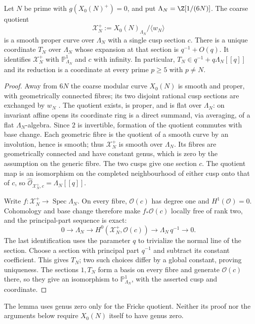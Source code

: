\begin{lemma}\label{lem:coordinate}
Let $N$ be prime with $g(X_0(N)^+)=0$, and put
$\Lambda_N=\Z[1/(6N)]$. The coarse quotient
\[
\mathcal X_N^+:=X_0(N)_{\Lambda_N}/\langle w_N\rangle
\]
is a smooth proper curve over $\Lambda_N$ with a single cusp section $c$.
There is a unique coordinate $T_N$ over $\Lambda_N$ whose expansion at
that section is $q^{-1}+O(q)$. It identifies $\mathcal X_N^+$ with
$\mathbb P^1_{\Lambda_N}$ and $c$ with infinity. In particular,
$T_N\in q^{-1}+q\Lambda_N[[q]]$ and its reduction is a coordinate
at every prime $p\ge5$ with $p\ne N$.
\end{lemma}
\begin{proof}
Away from $6N$ the coarse modular curve $X_0(N)$ is smooth and proper,
with geometrically connected fibres; its two disjoint rational cusp
sections are exchanged by $w_N$ \citep{DR73,KM85}.
The quotient exists, is proper, and is flat over $\Lambda_N$:
on invariant affine opens its coordinate ring is a direct summand,
via averaging, of a flat $\Lambda_N$-algebra. Since $2$ is invertible,
formation of the quotient commutes with base change. Each geometric
fibre is the quotient of a smooth curve by an involution, hence is
smooth; thus $\mathcal X_N^+$ is smooth over $\Lambda_N$.
Its fibres are geometrically connected and have constant genus,
which is zero by the assumption on the generic fibre.
The two cusps give one section $c$. The quotient map is an isomorphism
on the completed neighbourhood of either cusp onto that of $c$, so
$\widehat{\mathcal O}_{\mathcal X_N^+,c}=\Lambda_N[[q]]$.

Write $f:\mathcal X_N^+\to\operatorname{Spec}\Lambda_N$.
On every fibre, $\mathcal O(c)$ has degree one and $H^1(\mathcal O)=0$.
Cohomology and base change therefore make $f_*\mathcal O(c)$ locally
free of rank two, and the principal-part sequence is exact:
\[
0\longrightarrow\Lambda_N\longrightarrow
H^0(\mathcal X_N^+,\mathcal O(c))
\longrightarrow\Lambda_N\,q^{-1}\longrightarrow0.
\]
The last identification uses the parameter $q$ to trivialize the
normal line of the section. Choose a section with principal part
$q^{-1}$ and subtract its constant coefficient. This gives $T_N$;
two such choices differ by a global constant, proving uniqueness.
The sections $1,T_N$ form a basis on every fibre and generate
$\mathcal O(c)$ there, so they give an isomorphism to
$\mathbb P^1_{\Lambda_N}$, with the asserted cusp and coordinate.
\end{proof}

The lemma uses genus zero only for the Fricke quotient. Neither its
proof nor the arguments below require $X_0(N)$ itself to have genus zero.


